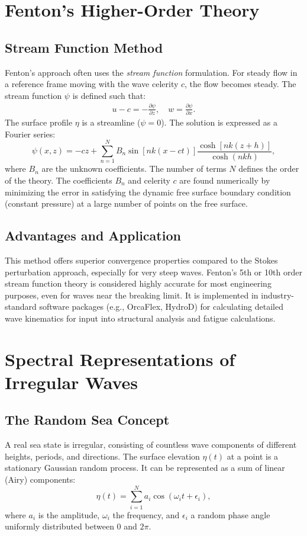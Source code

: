 \documentclass[11pt,a4paper]{article}
\begin{document}
\section{Fenton’s Higher-Order Theory}
\subsection{Stream Function Method}
Fenton's approach often uses the \emph{stream function} formulation. For steady flow in a reference frame moving with the wave celerity $c$, the flow becomes steady. The stream function $\psi$ is defined such that:
\begin{align}
u - c = -\frac{\partial \psi}{\partial z}, \quad w = \frac{\partial \psi}{\partial x}.
\end{align}
The surface profile $\eta$ is a streamline ($\psi = 0$). The solution is expressed as a Fourier series:
\begin{equation}
\psi(x,z) = -c z + \sum_{n=1}^{N} B_n \sin[nk(x - c t)] \frac{\cosh[nk(z+h)]}{\cosh(nkh)},
\end{equation}
where $B_n$ are the unknown coefficients. The number of terms $N$ defines the order of the theory. The coefficients $B_n$ and celerity $c$ are found numerically by minimizing the error in satisfying the dynamic free surface boundary condition (constant pressure) at a large number of points on the free surface.

\subsection{Advantages and Application}
This method offers superior convergence properties compared to the Stokes perturbation approach, especially for very steep waves. Fenton's 5th or 10th order stream function theory is considered highly accurate for most engineering purposes, even for waves near the breaking limit. It is implemented in industry-standard software packages (e.g., OrcaFlex, HydroD) for calculating detailed wave kinematics for input into structural analysis and fatigue calculations.

\section{Spectral Representations of Irregular Waves}
\subsection{The Random Sea Concept}
A real sea state is irregular, consisting of countless wave components of different heights, periods, and directions. The surface elevation $\eta(t)$ at a point is a stationary Gaussian random process. It can be represented as a sum of linear (Airy) components:
\begin{equation}
\eta(t) = \sum_{i=1}^{N} a_i \cos(\omega_i t + \epsilon_i),
\end{equation}
where $a_i$ is the amplitude, $\omega_i$ the frequency, and $\epsilon_i$ a random phase angle uniformly distributed between $0$ and $2\pi$.
\end{document}
